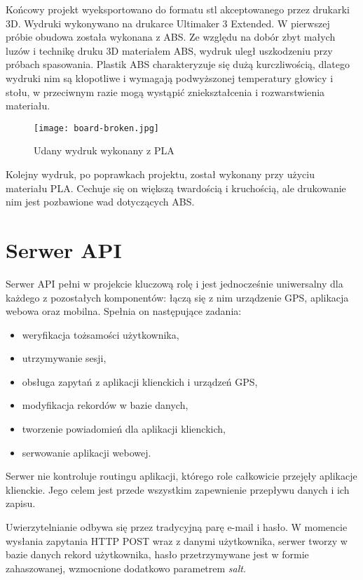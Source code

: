 \documentclass[eng,printmode]{mgr}
\begin{document}
Końcowy projekt wyeksportowano do formatu stl akceptowanego przez drukarki 3D. Wydruki wykonywano na drukarce Ultimaker 3 Extended. W pierwszej próbie obudowa została wykonana z ABS. Ze względu na dobór zbyt małych luzów i technikę druku 3D materiałem ABS, wydruk uległ uszkodzeniu przy próbach spasowania. Plastik ABS charakteryzuje się dużą kurczliwością, dlatego wydruki nim są kłopotliwe i wymagają podwyższonej temperatury głowicy i stołu, w przeciwnym razie mogą wystąpić zniekształcenia i rozwarstwienia materiału\cite{abs}.

\begin{figure}[!htbp]
\centering
\texttt{[image: board-broken.jpg]}
\caption{Udany wydruk wykonany z PLA}
\end{figure}


Kolejny wydruk, po poprawkach projektu, został wykonany przy użyciu materiału PLA. Cechuje się on większą twardością i kruchością, ale drukowanie nim jest pozbawione wad dotyczących ABS.






\section{Serwer API}
Serwer API pełni w projekcie kluczową rolę i jest jednocześnie uniwersalny dla każdego z pozostałych komponentów: łączą się z nim urządzenie GPS, aplikacja webowa oraz mobilna. Spełnia on następujące zadania:
\begin{itemize}
\item weryfikacja tożsamości użytkownika,
\item utrzymywanie sesji,
\item obsługa zapytań z aplikacji klienckich i urządzeń GPS,
\item modyfikacja rekordów w bazie danych,
\item tworzenie powiadomień dla aplikacji klienckich,
\item serwowanie aplikacji webowej.
\end{itemize}
Serwer nie kontroluje routingu aplikacji, którego role całkowicie przejęły aplikacje klienckie. Jego celem jest przede wszystkim zapewnienie przepływu danych i ich zapisu.

Uwierzytelnianie odbywa się przez tradycyjną parę e-mail i hasło. W momencie wysłania zapytania HTTP POST wraz z danymi użytkownika, serwer tworzy w bazie danych rekord użytkownika, hasło przetrzymywane jest w formie zahaszowanej, wzmocnione dodatkowo parametrem \textit{salt}.
\end{document}
